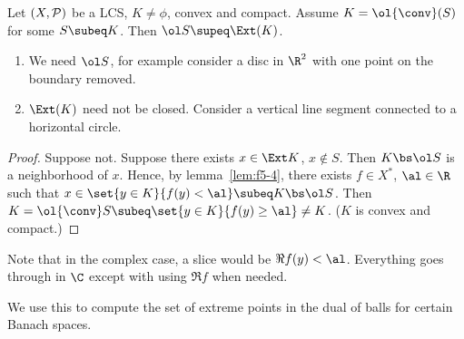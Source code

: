 \begin{thm} Let $(X,\cal P)$ be a LCS, $K\ne \phi$, convex and compact. Assume $K=\ol{\conv}(S)$ for some $S\subeq K$. Then $\ol S\supeq \Ext(K)$. 
\end{thm}
\begin{rem}
\begin{enumerate}
\item
We need $\ol S$, for example consider a disc in $\R^2$ with one point on the boundary removed.
\item $\Ext(K)$ need not be closed. Consider a vertical line segment connected to a horizontal circle. 
\end{enumerate}
\end{rem}
\begin{proof}
Suppose not. Suppose there exists $x\in \Ext K$, $x\nin S$. Then $K\bs \ol S$ is a neighborhood of $x$. Hence, by lemma~\ref{lem:f5-4}, there exists $f\in X^*$, $\al\in \R$ such that $x\in \set{y\in K}{f(y)<\al}\subeq K\bs \ol S$. Then $K=\ol{\conv}S\subeq \set{y\in K}{f(y)\ge \al}\ne K$. ($K$ is convex and compact.)
\end{proof}
Note that in the complex case, a slice would be $\Re f(y)<\al$. Everything goes through in $\C$ except with using $\Re f$ when needed.

We use this to compute the set of extreme points in the dual of balls for certain Banach spaces.

